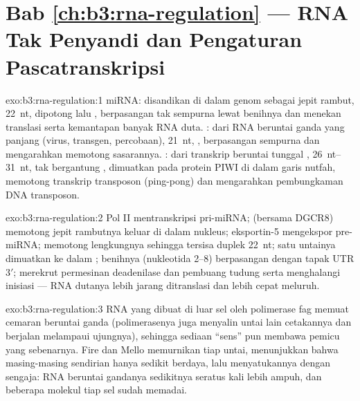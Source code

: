 \section*{Bab \ref{ch:b3:rna-regulation} --- RNA Tak Penyandi dan Pengaturan Pascatranskripsi}

\begin{solution}{exo:b3:rna-regulation:1}
miRNA: disandikan di dalam genom sebagai jepit rambut, \qty{22}{nt}, dipotong
 lalu , berpasangan tak sempurna lewat benihnya dan menekan
translasi serta kemantapan banyak RNA duta. : dari RNA beruntai
ganda yang panjang (virus, transgen, percobaan), \qty{21}{nt},
, berpasangan sempurna dan mengarahkan  memotong
sasarannya. : dari transkrip beruntai tunggal ,
\qtyrange{26}{31}{nt}, tak bergantung , dimuatkan pada protein PIWI di
dalam garis nutfah, memotong transkrip transposon (ping-pong) dan mengarahkan
pembungkaman  DNA transposon.
\end{solution}

\begin{solution}{exo:b3:rna-regulation:2}
Pol II mentranskripsi pri-miRNA;  (bersama DGCR8) memotong jepit
rambutnya keluar di dalam nukleus; eksportin-5 mengekspor pre-miRNA; 
memotong lengkungnya sehingga tersisa duplek \qty{22}{nt}; satu untainya
dimuatkan ke dalam ; benihnya (nukleotida 2--8) berpasangan dengan
tapak UTR 3$'$;  merekrut permesinan deadenilase dan pembuang tudung
serta menghalangi inisiasi --- RNA dutanya lebih jarang ditranslasi dan lebih
cepat meluruh.
\end{solution}

\begin{solution}{exo:b3:rna-regulation:3}
RNA yang dibuat di luar sel oleh polimerase fag memuat cemaran beruntai
ganda (polimerasenya juga menyalin untai lain cetakannya dan berjalan
melampaui ujungnya), sehingga sediaan ``sens'' pun membawa pemicu yang
sebenarnya. Fire dan Mello memurnikan tiap untai, menunjukkan bahwa
masing-masing sendirian hanya sedikit berdaya, lalu menyatukannya dengan
sengaja: RNA beruntai gandanya sedikitnya seratus kali lebih ampuh, dan
beberapa molekul tiap sel sudah memadai.
\end{solution}

